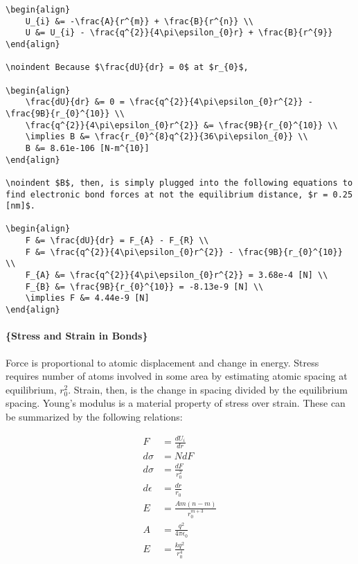\documentclass[
]{article}
\begin{document}
\begin{verbatim}
\begin{align}
    U_{i} &= -\frac{A}{r^{m}} + \frac{B}{r^{n}} \\
    U &= U_{i} - \frac{q^{2}}{4\pi\epsilon_{0}r} + \frac{B}{r^{9}}
\end{align}

\noindent Because $\frac{dU}{dr} = 0$ at $r_{0}$,

\begin{align}
    \frac{dU}{dr} &= 0 = \frac{q^{2}}{4\pi\epsilon_{0}r^{2}} - \frac{9B}{r_{0}^{10}} \\
    \frac{q^{2}}{4\pi\epsilon_{0}r^{2}} &= \frac{9B}{r_{0}^{10}} \\
    \implies B &= \frac{r_{0}^{8}q^{2}}{36\pi\epsilon_{0}} \\
    B &= 8.61e-106 [N-m^{10}]
\end{align}

\noindent $B$, then, is simply plugged into the following equations to find electronic bond forces at not the equilibrium distance, $r = 0.25 [nm]$.

\begin{align}
    F &= \frac{dU}{dr} = F_{A} - F_{R} \\
    F &= \frac{q^{2}}{4\pi\epsilon_{0}r^{2}} - \frac{9B}{r_{0}^{10}} \\
    F_{A} &= \frac{q^{2}}{4\pi\epsilon_{0}r^{2}} = 3.68e-4 [N] \\
    F_{B} &= \frac{9B}{r_{0}^{10}} = -8.13e-9 [N] \\
    \implies F &= 4.44e-9 [N]
\end{align}
\end{verbatim}

\hypertarget{stress-and-strain-in-bonds}{%
\paragraph{\{Stress and Strain in
Bonds\}}\label{stress-and-strain-in-bonds}}

Force is proportional to atomic displacement and change in energy.
Stress requires number of atoms involved in some area by estimating
atomic spacing at equilibrium, \(r_{0}^{2}\). Strain, then, is the
change in spacing divided by the equilibrium spacing. Young's modulus is
a material property of stress over strain. These can be summarized by
the following relations:

\begin{align}
    F &= \frac{dU_{i}}{dr} \\
    d\sigma &= NdF \\
    d\sigma &= \frac{dF}{r_{0}^{2}} \\
    d\epsilon &= \frac{dr}{r_{0}} \\
    E &= \frac{Am(n-m)}{r_{0}^{m + 3}} \\
    A &= \frac{q^{2}}{4\pi\epsilon_{0}} \\
    E &= \frac{kq^{2}}{r_{0}^{4}}
\end{align}
\end{document}
